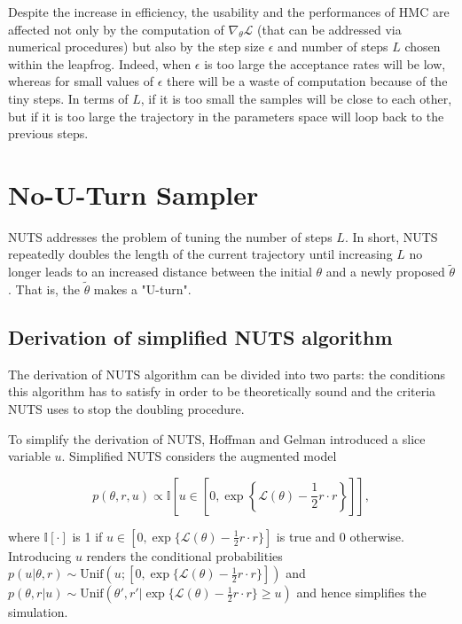 \documentclass{article}
\begin{document}
Despite the increase in efficiency, the usability and the performances of HMC are affected not only by the computation of $\nabla_{\theta}\mathcal{L}$ (that can be addressed via numerical procedures) but also by the step size $\epsilon$ and number of steps $L$ chosen within the leapfrog. Indeed, when $\epsilon$ is too large the acceptance rates will be low, whereas for small values of $\epsilon$ there will be a waste of computation because of the tiny steps. In terms of $L$, if it is too small the samples will be close to each other, but if it is too large the trajectory in the parameters space will loop back to the previous steps.

\section{No-U-Turn Sampler}


NUTS addresses the problem of tuning the number of steps $L$. In short, NUTS repeatedly doubles the length of the current trajectory until increasing $L$ no longer leads to an increased distance between the initial $\theta$ and a newly proposed $\tilde{\theta}$. That is, the $\tilde{\theta}$ makes a "U-turn".

\subsection{Derivation of simplified NUTS algorithm}
The derivation of NUTS algorithm can be divided into two parts: the conditions this algorithm has to satisfy in order to be theoretically sound and the criteria NUTS uses to stop the doubling procedure.

To simplify the derivation of NUTS, Hoffman and Gelman introduced a slice variable $u$. Simplified NUTS considers the augmented model

$$p(\theta,r,u)\propto\mathbb{I}\left[u\in\left[0,\exp\left\{\mathcal{L}(\theta)-\frac{1}{2}r\cdot r\right\}\right]\right],$$

where $\mathbb{I}[\cdot]$ is 1 if $u\in \left[0,\exp\{\mathcal{L}(\theta)-\frac{1}{2}r\cdot r\}\right]$ is true and 0 otherwise.
Introducing $u$ renders the conditional probabilities $p(u|\theta,r) \sim \text{Unif}(u;[0, \exp\{\mathcal{L}(\theta)-\frac{1}{2}r\cdot r\}])$ and $p(\theta,r|u) \sim \text{Unif}(\theta', r' | \exp\{\mathcal{L}(\theta)-\frac{1}{2}r\cdot r\}\geq u)$ and hence simplifies the simulation.
\end{document}
